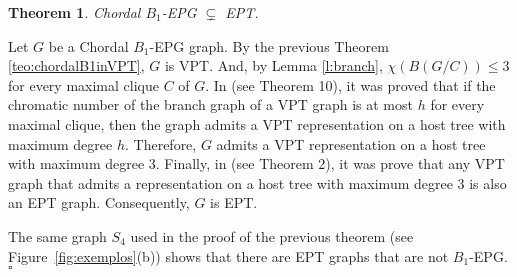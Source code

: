 \documentclass[9pt]{entcs}
\newtheorem{teo}[thm]{Theorem}%
\newcommand{\la}[1]{\textcolor{blue}{\sf{#1}}}%
\newcommand{\tanilson}[1]{\textcolor{auburn}{\sf{#1}}}%
\begin{document}








\begin{teo}\label{teo:b1epgept}
Chordal $B_1$-EPG $\subsetneq$ EPT. 
\end{teo}

\begin{pf}
Let $G$ be a  Chordal $B_1$-EPG graph. By the previous Theorem \ref{teo:chordalB1inVPT}, $G$ is VPT. And,  by Lemma \ref{l:branch}, $\chi(B(G/C))\leq 3$ for every maximal clique $C$ of $G$.   In \cite{alcon2014recognizing} (see Theorem 10), it was proved that if the chromatic number of the branch graph of a VPT graph is at most $h$ for every maximal clique, then the graph admits a VPT representation on a host tree with maximum degree $h$.  Therefore, $G$ admits a VPT representation on a host tree with maximum degree 3.  Finally, in \cite{ golumbic1985edge} (see Theorem 2), it was prove that any VPT graph that  admits a representation on a host tree with maximum degree 3 is also an EPT graph. Consequently,  $G$ is EPT.

The same graph   $S_4$ used in the proof of the previous theorem (see Figure~\ref{fig:exemplos}(b)) shows that there are EPT graphs that are not $B_1$-EPG. 
%
\hfill $\square$\end{pf} 
\end{document}
